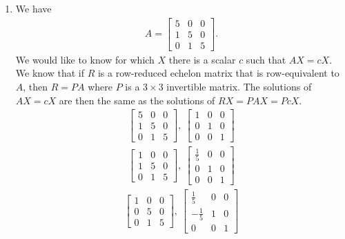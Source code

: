 \documentclass[12pt]{article}
\begin{document}
\begin{enumerate}
  \item
    We have
    \begin{align*}
      A =
      \begin{bmatrix}
        5 & 0 & 0\\
        1 & 5 & 0\\
        0 & 1 & 5
      \end{bmatrix}.
    \end{align*}
    We would like to know for which $X$ there is a scalar $c$
    such that $AX = cX$. We know that if $R$ is a row-reduced
    echelon matrix that is row-equivalent to $A$, then $R = PA$
    where $P$ is a $3 \times 3$ invertible matrix. The solutions
    of $AX = cX$ are then the same as the solutions of $RX = PAX
    = PcX$.
    \begin{align*}
      \begin{bmatrix}
        5 & 0 & 0\\
        1 & 5 & 0\\
        0 & 1 & 5
      \end{bmatrix},\
      \begin{bmatrix}
        1 & 0 & 0\\
        0 & 1 & 0\\
        0 & 0 & 1
      \end{bmatrix}
    \end{align*}
    \begin{align*}
      \begin{bmatrix}
        1 & 0 & 0\\
        1 & 5 & 0\\
        0 & 1 & 5
      \end{bmatrix},\
      \begin{bmatrix}
        \frac{1}{5} & 0 & 0\\
        0 & 1 & 0\\
        0 & 0 & 1
      \end{bmatrix}
    \end{align*}
    \begin{align*}
      \begin{bmatrix}
        1 & 0 & 0\\
        0 & 5 & 0\\
        0 & 1 & 5
      \end{bmatrix},\
      \begin{bmatrix}
        \frac{1}{5} & 0 & 0\\
        -\frac{1}{5} & 1 & 0\\
        0 & 0 & 1

\end{bmatrix}
\end{align*}
\end{enumerate}
\end{document}
